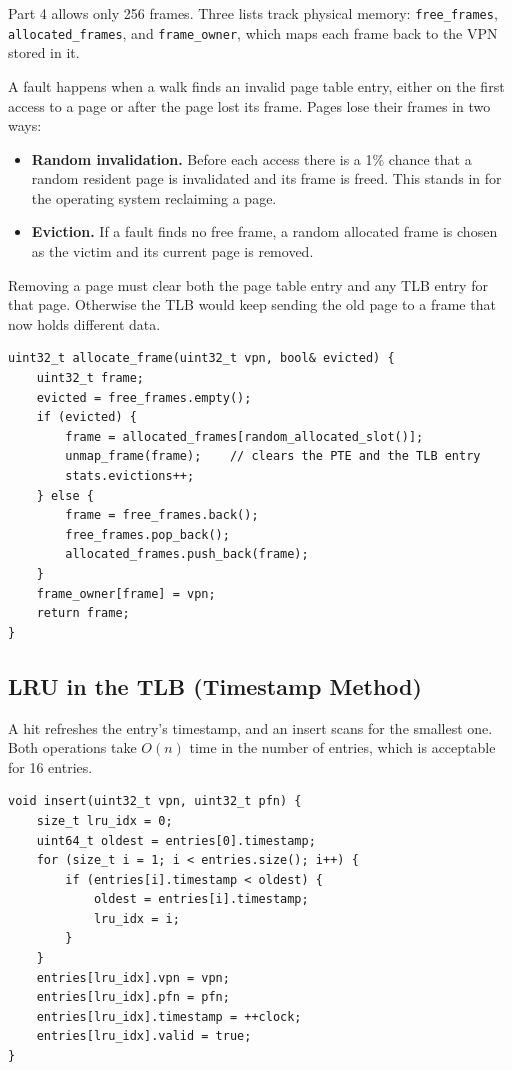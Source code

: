 \documentclass[11pt]{article}
\newcommand{\code}[1]{\texttt{#1}}
\begin{document}
Part 4 allows only 256 frames. Three lists track physical memory:
\code{free\_frames}, \code{allocated\_frames}, and \code{frame\_owner}, which maps
each frame back to the VPN stored in it.

A fault happens when a walk finds an invalid page table entry, either on the
first access to a page or after the page lost its frame. Pages lose their frames
in two ways:
\begin{itemize}
  \item \textbf{Random invalidation.} Before each access there is a 1\% chance
  that a random resident page is invalidated and its frame is freed. This stands
  in for the operating system reclaiming a page.
  \item \textbf{Eviction.} If a fault finds no free frame, a random allocated
  frame is chosen as the victim and its current page is removed.
\end{itemize}

Removing a page must clear both the page table entry and any TLB entry for that
page. Otherwise the TLB would keep sending the old page to a frame that now holds
different data.

\begin{lstlisting}
uint32_t allocate_frame(uint32_t vpn, bool& evicted) {
    uint32_t frame;
    evicted = free_frames.empty();
    if (evicted) {
        frame = allocated_frames[random_allocated_slot()];
        unmap_frame(frame);    // clears the PTE and the TLB entry
        stats.evictions++;
    } else {
        frame = free_frames.back();
        free_frames.pop_back();
        allocated_frames.push_back(frame);
    }
    frame_owner[frame] = vpn;
    return frame;
}
\end{lstlisting}

\subsection{LRU in the TLB (Timestamp Method)}

A hit refreshes the entry's timestamp, and an insert scans for the smallest one.
Both operations take $O(n)$ time in the number of entries, which is acceptable
for 16 entries.

\begin{lstlisting}
void insert(uint32_t vpn, uint32_t pfn) {
    size_t lru_idx = 0;
    uint64_t oldest = entries[0].timestamp;
    for (size_t i = 1; i < entries.size(); i++) {
        if (entries[i].timestamp < oldest) {
            oldest = entries[i].timestamp;
            lru_idx = i;
        }
    }
    entries[lru_idx].vpn = vpn;
    entries[lru_idx].pfn = pfn;
    entries[lru_idx].timestamp = ++clock;
    entries[lru_idx].valid = true;
}
\end{lstlisting}
\end{document}
